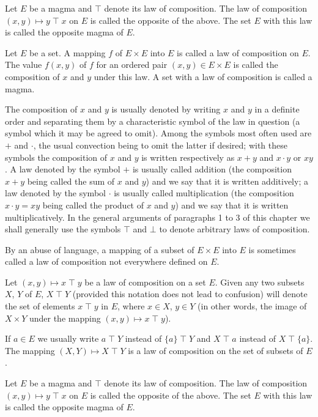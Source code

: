 \documentclass[twoside,usebookdim]{bourbaki}
\begin{document}
\begin{definition}
Let $E$ be a magma and $\mathbin{\top}$ denote its law of composition. The law of
composition $(x, y)\mapsto y\mathbin{\top} x$ on $E$ is called the opposite of the
above. The set $E$ with this law is called the opposite magma of $E$.
\end{definition}

\begin{definition}
Let $E$ be a set. A mapping $f$ of $E\times E$ into $E$ is called a law
of composition on $E$. The value $f(x,y)$ of $f$ for an ordered pair
$(x,y)\in E\times E$ is called the composition of $x$ and $y$ under this
law. A set with a law of composition is called a magma.
\end{definition}

The composition of $x$ and $y$ is usually denoted by writing $x$ and $y$
in a definite order and separating them by a characteristic symbol of
the law in question (a symbol which it may be agreed to omit). Among the
symbols most often used are $+$ and $\cdot$, the usual convection being
to omit the latter if desired; with these symbols the composition of $x$
and $y$ is written respectively as $x + y$ and $x\cdot y$ or $xy$.
A law denoted by the symbol $+$ is usually called addition (the
composition $x + y$ being called the sum of $x$ and $y$) and we say that
it is written additively; a law denoted by the symbol $\cdot$ is usually
called multiplication (the composition $x\cdot y = xy$ being called the
product of $x$ and $y$) and we say that it is written
multiplicatively. In the general arguments of paragraphs 1 to 3 of this
chapter we shall generally use the symbols $\mathbin{\top}$ and $\bot$ to denote
arbitrary laws of composition.

By an abuse of language, a mapping of a subset of $E\times E$ into $E$
is sometimes called a law of composition not everywhere defined on $E$.

Let $(x,y)\mapsto x\mathbin{\top} y$ be a law of composition on a set $E$. Given
any two subsets $X$, $Y$ of $E$, $X \mathbin{\top} Y$ (provided this notation does
not lead to confusion) will denote the set of elements $x\mathbin{\top} y$ in $E$,
where $x\in X$, $y\in Y$ (in other words, the image of $X\times Y$ under
the mapping $(x,y)\mapsto x\mathbin{\top} y$).

If $a\in E$ we usually write $a\mathbin{\top} Y$ instead of $\{a\}\mathbin{\top} Y$ and
$X\mathbin{\top} a$ instead of $X\mathbin{\top}\{a\}$. The mapping $(X, Y)\mapsto X\mathbin{\top} Y$
is a law of composition on the set of subsets of $E$.

\begin{definition}
Let $E$ be a magma and $\mathbin{\top}$ denote its law of composition. The law of
composition $(x, y)\mapsto y\mathbin{\top} x$ on $E$ is called the opposite of the
above. The set $E$ with this law is called the opposite magma of $E$.
\end{definition}
\end{document}
